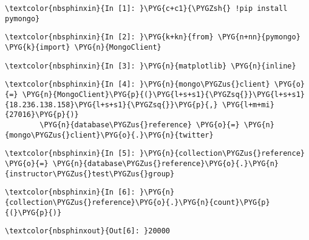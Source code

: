 \documentclass[letterpaper,10pt,english]{sphinxmanual}
\begin{document}
\relax

%
\begin{Verbatim}[commandchars=\\\{\}]
\textcolor{nbsphinxin}{In [1]: }\PYG{c+c1}{\PYGZsh{} !pip install pymongo}
\end{Verbatim}

%
\begin{Verbatim}[commandchars=\\\{\}]
\textcolor{nbsphinxin}{In [2]: }\PYG{k+kn}{from} \PYG{n+nn}{pymongo} \PYG{k}{import} \PYG{n}{MongoClient}
\end{Verbatim}

%
\begin{Verbatim}[commandchars=\\\{\}]
\textcolor{nbsphinxin}{In [3]: }\PYG{n}{matplotlib} \PYG{n}{inline}
\end{Verbatim}

%
\begin{Verbatim}[commandchars=\\\{\}]
\textcolor{nbsphinxin}{In [4]: }\PYG{n}{mongo\PYGZus{}client} \PYG{o}{=} \PYG{n}{MongoClient}\PYG{p}{(}\PYG{l+s+s1}{\PYGZsq{}}\PYG{l+s+s1}{18.236.138.158}\PYG{l+s+s1}{\PYGZsq{}}\PYG{p}{,} \PYG{l+m+mi}{27016}\PYG{p}{)}
        \PYG{n}{database\PYGZus{}reference} \PYG{o}{=} \PYG{n}{mongo\PYGZus{}client}\PYG{o}{.}\PYG{n}{twitter}
\end{Verbatim}

%
\begin{Verbatim}[commandchars=\\\{\}]
\textcolor{nbsphinxin}{In [5]: }\PYG{n}{collection\PYGZus{}reference} \PYG{o}{=} \PYG{n}{database\PYGZus{}reference}\PYG{o}{.}\PYG{n}{instructor\PYGZus{}test\PYGZus{}group}
\end{Verbatim}

%
\begin{Verbatim}[commandchars=\\\{\}]
\textcolor{nbsphinxin}{In [6]: }\PYG{n}{collection\PYGZus{}reference}\PYG{o}{.}\PYG{n}{count}\PYG{p}{(}\PYG{p}{)}
\end{Verbatim}

%
\begin{Verbatim}[commandchars=\\\{\}]
\textcolor{nbsphinxout}{Out[6]: }20000
\end{Verbatim}
\end{document}
